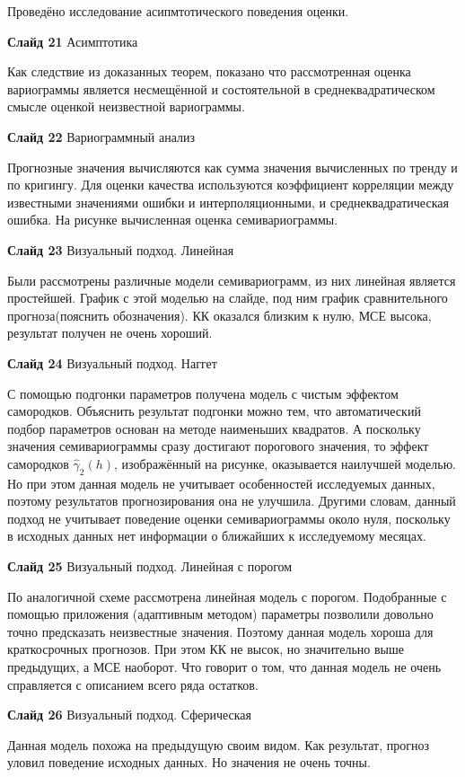 \documentclass[a4paper,10pt]{report}
\begin{document}
Проведёно исследование асипмтотического поведения оценки.

\textbf{Слайд 21} Асимптотика

Как следствие из доказанных теорем, показано что рассмотренная оценка вариограммы является несмещённой и состоятельной в среднеквадратическом смысле оценкой неизвестной вариограммы.

\textbf{Слайд 22} Вариограммный анализ

Прогнозные значения вычисляются как сумма значения вычисленных по тренду и по кригингу. Для оценки качества используются коэффициент корреляции между известными значениями ошибки и интерполяционными, и среднеквадратическая ошибка. На рисунке вычисленная оценка семивариограммы.

\textbf{Слайд 23} Визуальный подход. Линейная

Были рассмотрены различные модели семивариограмм, из них линейная является простейшей. График с этой моделью на слайде, под ним график сравнительного прогноза(пояснить обозначения). КК оказался близким к нулю, МСЕ высока, результат получен не очень хороший.

\textbf{Слайд 24} Визуальный подход. Наггет

С помощью подгонки параметров получена модель с чистым эффектом самородков. Объяснить результат подгонки можно тем, что автоматический подбор параметров основан на методе наименьших квадратов. А поскольку значения семивариограммы сразу достигают порогового значения, то эффект самородков $ \widehat{\gamma}_2(h) $, изображённый на рисунке, оказывается наилучшей моделью. Но при этом данная модель не учитывает особенностей исследуемых данных, поэтому результатов прогнозирования она не улучшила. Другими словам, данный подход не учитывает поведение оценки семивариограммы около нуля, поскольку в исходных данных нет информации о ближайших к исследуемому месяцах.

\textbf{Слайд 25} Визуальный подход. Линейная с порогом

По аналогичной схеме рассмотрена линейная модель с порогом. Подобранные с помощью приложения (адаптивным методом) параметры позволили довольно точно предсказать неизвестные значения. Поэтому данная модель хороша для краткосрочных прогнозов. При этом КК не высок, но значительно выше предыдущих, а МСЕ наоборот. Что говорит о том, что данная модель не очень справляется с описанием всего ряда остатков.

\textbf{Слайд 26} Визуальный подход. Сферическая

Данная модель похожа на предыдущую своим видом. Как результат, прогноз уловил поведение исходных данных. Но значения не очень точны.
\end{document}
